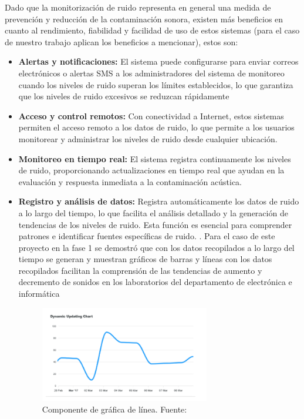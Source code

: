 {{\begin{itemize}
Dado que la monitorización de ruido representa en general una medida de prevención y reducción de la contaminación sonora, existen más beneficios en cuanto al rendimiento, fiabilidad y facilidad de uso de estos sistemas (para el caso de nuestro trabajo aplican los beneficios a mencionar), estos son: 

\begin{itemize}

    \item \textbf{Alertas y notificaciones:} El sistema puede configurarse para enviar correos electrónicos o alertas SMS a los administradores del sistema de monitoreo cuando los niveles de ruido superan los límites establecidos, lo que garantiza que los niveles de ruido excesivos se reduzcan rápidamente \parencite{AdvanceTech2024}
    \vspace{1cm}
    \item \textbf{Acceso y control remotos:} Con conectividad a Internet, estos sistemas permiten el acceso remoto a los datos de ruido, lo que permite a los usuarios monitorear y administrar los niveles de ruido desde cualquier ubicación. \parencite{AdvanceTech2024}
    \vspace{1cm}
    \item \textbf{Monitoreo en tiempo real:} El sistema registra continuamente los niveles de ruido, proporcionando actualizaciones en tiempo real que ayudan en la evaluación y respuesta inmediata a la contaminación acústica. \parencite{AdvanceTech2024}
    \vspace{1cm}
    \item \textbf{Registro y análisis de datos:} Registra automáticamente los datos de ruido a lo largo del tiempo, lo que facilita el análisis detallado y la generación de tendencias de los niveles de ruido. Esta función es esencial para comprender patrones e identificar fuentes específicas de ruido. \parencite{AdvanceTech2024}. Para el caso de este proyecto en la fase 1 se demostró que con los datos recopilados a lo largo del tiempo se generan y muestran gráficos de barras y líneas con los datos recopilados facilitan la comprensión de las tendencias de aumento y decremento de sonidos en los laboratorios del departamento de electrónica e informática \parencite{carpio2025}
    
            \begin{figure}[h!]
              \centering
              \includegraphics[width=0.7\textwidth]{img/grafico_linea.png}
              \caption{Componente de gráfica de línea. Fuente: \parencite{carpio2025}}
              \label{fig:your_label}
            \end{figure} 


\end{itemize}
\end{itemize}}}
